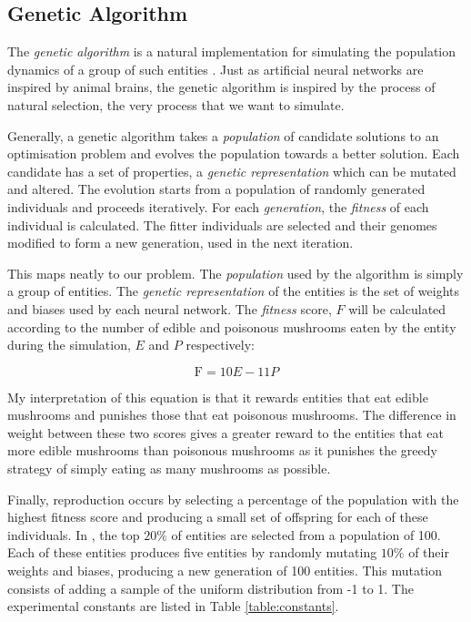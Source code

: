 \documentclass[12pt,a4paper]{report}
\begin{document}
\subsection{Genetic Algorithm}\label{section:genetic}

The \emph{genetic algorithm} is a natural implementation for simulating the population dynamics of a group of such entities \citep{holland1992adaptation}. Just as artificial neural networks are inspired by animal brains, the genetic algorithm is inspired by the process of natural selection, the very process that we want to simulate. 

Generally, a genetic algorithm takes a \emph{population} of candidate solutions to an optimisation problem and evolves the population towards a better solution. Each candidate has a set of properties, a \emph{genetic representation} which can be mutated and altered. The evolution starts from a population of randomly generated individuals and proceeds iteratively. For each \emph{generation}, the \emph{fitness} of each individual is calculated. The fitter individuals are selected and their genomes modified to form a new generation, used in the next iteration.

This maps neatly to our problem. The \emph{population} used by the algorithm is simply a group of entities. The \emph{genetic representation} of the entities is the set of weights and biases used by each neural network. The \emph{fitness} score, $F$ will be calculated according to the number of edible and poisonous mushrooms eaten by the entity during the simulation, $E$ and $P$ respectively:

\begin{equation}
\label{equation:fitness}
\mathrm{F} = 10 E- 11 P
\end{equation}

My interpretation of this equation is that it rewards entities that eat edible mushrooms and punishes those that eat poisonous mushrooms. The difference in weight between these two scores gives a greater reward to the entities that eat more edible mushrooms than poisonous mushrooms as it punishes the greedy strategy of simply eating as many mushrooms as possible.

Finally, reproduction occurs by selecting a percentage of the population with the highest fitness score and producing a small set of offspring for each of these individuals. In \cite{Cangelosi1998}, the top $20\%$ of entities are selected from a population of 100. Each of these entities produces five entities by randomly mutating $10\%$ of their weights and biases, producing a new generation of 100 entities. This mutation consists of adding a sample of the uniform distribution from -1 to 1. The experimental constants are listed in Table \ref{table:constants}.
\end{document}
